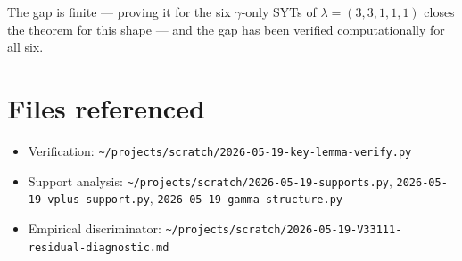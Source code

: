 \documentclass[11pt]{article}
\begin{document}
The gap is finite — proving it for the six $\gamma$-only SYTs of
$\lambda=(3,3,1,1,1)$ closes the theorem for this shape — and the gap has been
verified computationally for all six.

\section*{Files referenced}
\begin{itemize}
\item Verification: \texttt{\textasciitilde/projects/scratch/2026-05-19-key-lemma-verify.py}
\item Support analysis: \texttt{\textasciitilde/projects/scratch/2026-05-19-supports.py},
\texttt{2026-05-19-vplus-support.py}, \texttt{2026-05-19-gamma-structure.py}
\item Empirical discriminator: \texttt{\textasciitilde/projects/scratch/2026-05-19-V33111-residual-diagnostic.md}
\end{itemize}
\end{document}
